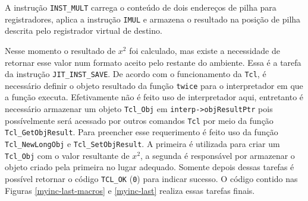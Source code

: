 A instrução \verb!INST_MULT! carrega o conteúdo de dois endereços de
pilha para registradores, aplica a instrução \verb!IMUL! e
armazena o resultado na posição de pilha descrita pelo registrador
virtual de destino.

Nesse momento o resultado de $x^2$ foi calculado, mas existe a
necessidade de retornar esse valor num formato aceito pelo restante do
ambiente. Essa é a tarefa da instrução \verb!JIT_INST_SAVE!.
De acordo com o funcionamento da \texttt{Tcl}, é
necessário definir o objeto resultado da função \verb!twice! para o
interpretador em que a função executa. Efetivamente não é feito
uso de interpretador aqui, entretanto é necessário armazenar
um objeto \verb!Tcl_Obj! em \verb!interp->objResultPtr! pois possívelmente será acessado
por outros comandos \texttt{Tcl} por meio da função \verb!Tcl_GetObjResult!.
Para preencher esse requerimento é feito uso da função
\verb!Tcl_NewLongObj! e \verb!Tcl_SetObjResult!. A primeira é
utilizada para criar um \verb!Tcl_Obj! com o valor resultante de
$x^2$, a segunda é responsável por armazenar o objeto criado pela
primeira no lugar adequado.
Somente depois dessas tarefas é possível
retornar o código \verb!TCL_OK! (\verb!0!) para indicar sucesso.
O código contido nas Figuras \ref{myinc-last-macros} e \ref{myinc-last}
realiza essas tarefas finais.


